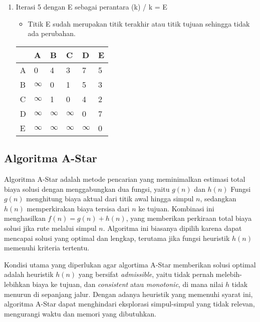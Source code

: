 \begin{enumerate}
    \item Iterasi 5 dengan E sebagai perantara (k) / k = E
    \begin{itemize}
        \item Titik E sudah merupakan titik terakhir atau titik tujuan sehingga tidak ada perubahan.
    \end{itemize}
    \begin{table}[H]
        \begin{tabular}{|l|l|l|l|l|l|}
        \hline
          & A        & B        & C        & D        & E        \\ \hline
        A & 0        & 4        & 3        & 7        & 5 \\ \hline
        B & $\infty$ & 0        & 1        & 5        & 3 \\ \hline
        C & $\infty$ & 1        & 0        & 4        & 2        \\ \hline
        D & $\infty$ & $\infty$ & $\infty$ & 0        & 7        \\ \hline
        E & $\infty$ & $\infty$ & $\infty$ & $\infty$ & 0        \\ \hline
        \end{tabular}
    \end{table}
    
\end{enumerate}
\newpage
\subsection{Algoritma A-Star ~\cite{Russell:09:ai}}
\label{a*}
Algoritma A-Star adalah metode pencarian yang meminimalkan estimasi total biaya solusi dengan menggabungkan dua fungsi, yaitu $g(n)$ dan $h(n)$ Fungsi $g(n)$ menghitung biaya aktual dari titik awal hingga simpul $n$, sedangkan $h(n)$ memperkirakan biaya tersisa dari $n$ ke tujuan. Kombinasi ini menghasilkan $f(n) = g(n) + h(n)$, yang memberikan perkiraan total biaya solusi jika rute melalui simpul $n$. Algoritma ini biasanya dipilih karena dapat mencapai solusi yang optimal dan lengkap, terutama jika fungsi heuristik $h(n)$ memenuhi kriteria tertentu.

Kondisi utama yang diperlukan agar algortima A-Star memberikan solusi optimal adalah heuristik $h(n)$ yang bersifat \textit{admissible}, yaitu tidak pernah melebih-lebihkan biaya ke tujuan, dan \textit{consistent} atau \textit{monotonic}, di mana nilai $h$ tidak menurun di sepanjang jalur. Dengan adanya heuristik yang memenuhi syarat ini, algoritma A-Star dapat menghindari eksplorasi simpul-simpul yang tidak relevan, mengurangi waktu dan memori yang dibutuhkan.

